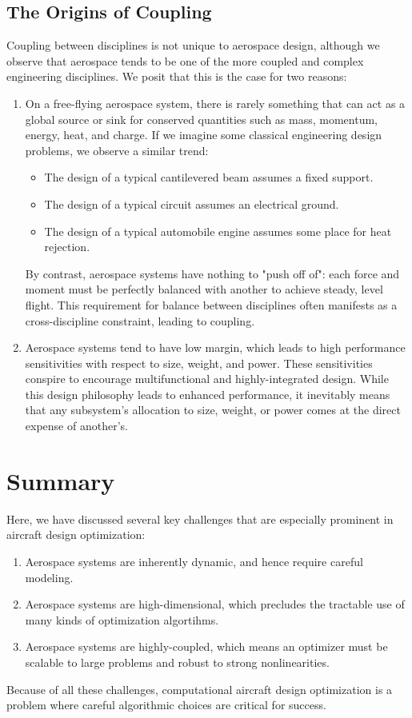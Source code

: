 \subsection{The Origins of Coupling}

Coupling between disciplines is not unique to aerospace design, although we observe that aerospace tends to be one of the more coupled and complex engineering disciplines. We posit that this is the case for two reasons:

\begin{enumerate}
    \item On a free-flying aerospace system, there is rarely something that can act as a global source or sink for conserved quantities such as mass, momentum, energy, heat, and charge. If we imagine some classical engineering design problems, we observe a similar trend:
    \begin{itemize}
        \item The design of a typical cantilevered beam assumes a fixed support.
        \item The design of a typical circuit assumes an electrical ground.
        \item The design of a typical automobile engine assumes some place for heat rejection.
    \end{itemize}
    By contrast, aerospace systems have nothing to "push off of": each force and moment must be perfectly balanced with another to achieve steady, level flight. This requirement for balance between disciplines often manifests as a cross-discipline constraint, leading to coupling.
    \item Aerospace systems tend to have low margin, which leads to high performance sensitivities with respect to size, weight, and power. These sensitivities conspire to encourage multifunctional and highly-integrated design. While this design philosophy leads to enhanced performance, it inevitably means that any subsystem's allocation to size, weight, or power comes at the direct expense of another's.
\end{enumerate}


\section{Summary}

Here, we have discussed several key challenges that are especially prominent in aircraft design optimization:

\begin{enumerate}
    \item Aerospace systems are inherently dynamic, and hence require careful modeling.
    \item Aerospace systems are high-dimensional, which precludes the tractable use of many kinds of optimization algortihms.
    \item Aerospace systems are highly-coupled, which means an optimizer must be scalable to large problems and robust to strong nonlinearities.
\end{enumerate}

Because of all these challenges, computational aircraft design optimization is a problem where careful algorithmic choices are critical for success.